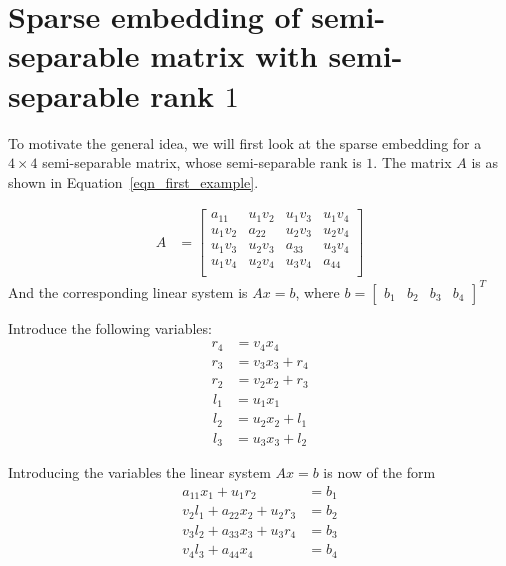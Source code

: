 \documentclass[times]{nlaauth}
\begin{document}

\section{Sparse embedding of semi-separable matrix with semi-separable rank $1$}
To motivate the general idea, we will first look at the sparse embedding for a $4 \times 4$ semi-separable matrix, whose semi-separable rank is $1$. The matrix $A$ is as shown in Equation~\eqref{eqn_first_example}.

\begin{align}
A & =
\begin{bmatrix}
a_{11} & u_1v_2 & u_1v_3 & u_1v_4\\
u_1v_2 & a_{22} & u_2v_3 & u_2v_4\\
u_1v_3 & u_2v_3 & a_{33} & u_3v_4\\
u_1v_4 & u_2v_4 & u_3v_4 & a_{44}\\
\end{bmatrix}
\label{eqn_first_example}
\end{align}
And the corresponding linear system is $Ax=b$, where $b=\begin{bmatrix} b_1& b_2& b_3& b_4 \end{bmatrix}^T$

Introduce the following variables:
\begin{align}
r_4 & = v_4x_4\\
r_3 & = v_3x_3 + r_4\\
r_2 & = v_2x_2 + r_3
\end{align}
\begin{align}
l_1 & = u_1x_1\\
l_2 & = u_2x_2 + l_1\\
l_3 & = u_3x_3 + l_2
\end{align}

Introducing the variables the linear system $Ax=b$ is now of the form
\begin{align}
a_{11}x_1 + u_1r_2 & = b_1\\
v_2 l_1 + a_{22}x_2 + u_2r_3 & = b_2\\
v_3 l_2 + a_{33}x_3 + u_3r_4 & = b_3\\
v_4 l_3 + a_{44}x_4 & = b_4
\end{align}
\end{document}
